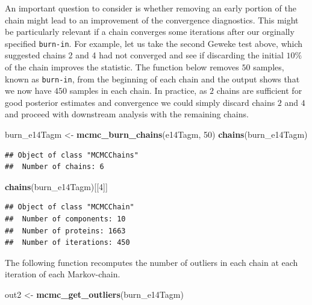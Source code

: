 \documentclass[
]{article}
\newenvironment{Shaded}{\begin{snugshade}}{\end{snugshade}}
\newcommand{\DecValTok}[1]{\textcolor[rgb]{0.00,0.00,0.81}{#1}}
\newcommand{\KeywordTok}[1]{\textcolor[rgb]{0.13,0.29,0.53}{\textbf{#1}}}
\newcommand{\NormalTok}[1]{#1}
\newcommand{\StringTok}[1]{\textcolor[rgb]{0.31,0.60,0.02}{#1}}
\begin{document}
An important question to consider is whether removing an early portion
of the chain might lead to an improvement of the convergence
diagnostics. This might be particularly relevant if a chain converges
some iterations after our orginally specified \texttt{burn-in}. For
example, let us take the second Geweke test above, which suggested
chains 2 and 4 had not converged and see if discarding the initial
\(10\%\) of the chain improves the statistic. The function below removes
\(50\) samples, known as \texttt{burn-in}, from the beginning of each
chain and the output shows that we now have \(450\) samples in each
chain. In practice, as \(2\) chains are sufficient for good posterior
estimates and convergence we could simply discard chains \(2\) and \(4\)
and proceed with downstream analysis with the remaining chains.

\begin{Shaded}
\begin{Highlighting}[]
\NormalTok{burn_e14Tagm <-}\StringTok{ }\KeywordTok{mcmc_burn_chains}\NormalTok{(e14Tagm, }\DecValTok{50}\NormalTok{)}
\KeywordTok{chains}\NormalTok{(burn_e14Tagm)}
\end{Highlighting}
\end{Shaded}

\begin{verbatim}
## Object of class "MCMCChains"
##  Number of chains: 6
\end{verbatim}

\begin{Shaded}
\begin{Highlighting}[]
\KeywordTok{chains}\NormalTok{(burn_e14Tagm)[[}\DecValTok{4}\NormalTok{]]}
\end{Highlighting}
\end{Shaded}

\begin{verbatim}
## Object of class "MCMCChain"
##  Number of components: 10 
##  Number of proteins: 1663 
##  Number of iterations: 450
\end{verbatim}

The following function recomputes the number of outliers in each chain
at each iteration of each Markov-chain.

\begin{Shaded}
\begin{Highlighting}[]
\NormalTok{out2 <-}\StringTok{ }\KeywordTok{mcmc_get_outliers}\NormalTok{(burn_e14Tagm)}
\end{Highlighting}
\end{Shaded}
\end{document}
